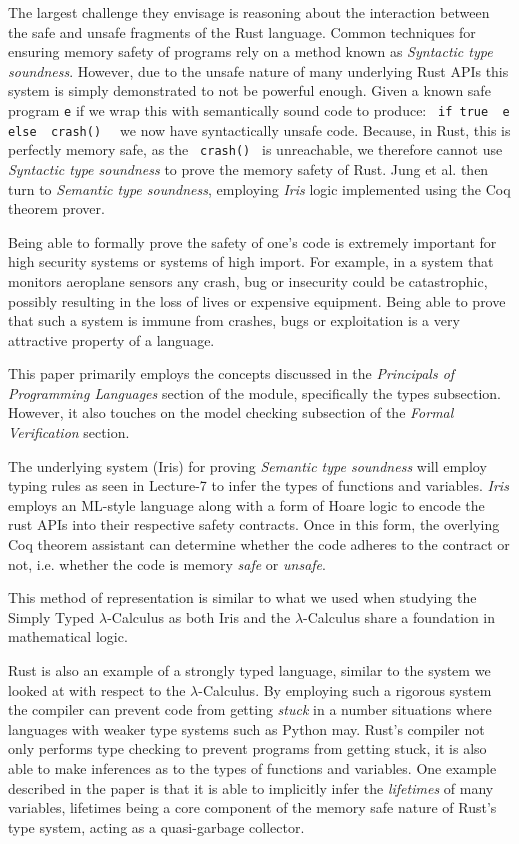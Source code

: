 \documentclass[11pt]{article}
\begin{document}
The largest challenge they envisage is reasoning about the interaction between the safe and unsafe fragments of the Rust language. Common techniques for ensuring memory safety of programs rely on a method known as \textit{Syntactic type soundness}. However, due to the unsafe nature of many underlying Rust APIs this system is simply demonstrated to not be powerful enough. Given a known safe program \texttt{e} if we wrap this with semantically sound code to produce: \texttt{ if true { e } else { crash() } } we now have syntactically unsafe code. Because, in Rust, this is perfectly memory safe, as the \texttt{ crash() } is unreachable, we therefore cannot use \textit{Syntactic type soundness} to prove the memory safety of Rust. Jung et al. then turn to \textit{Semantic type soundness}, employing \textit{Iris} logic implemented using the Coq theorem prover.

Being able to formally prove the safety of one's code is extremely important for high security systems or systems of high import. For example, in a system that monitors aeroplane sensors any crash, bug or insecurity could be catastrophic, possibly resulting in the loss of lives or expensive equipment. Being able to prove that such a system is immune from crashes, bugs or exploitation is a very attractive property of a language.

This paper primarily employs the concepts discussed in the \textit{Principals of Programming Languages} section of the module, specifically the types subsection. However, it also touches on the model checking subsection of the \textit{Formal Verification} section.

The underlying system (Iris) for proving \textit{Semantic type soundness} will employ typing rules as seen in Lecture-7 to infer the types of functions and variables. \textit{Iris} employs an ML-style language along with a form of Hoare logic to encode the rust APIs into their respective safety contracts. Once in this form, the overlying Coq theorem assistant can determine whether the code adheres to the contract or not, i.e. whether the code is memory \textit{safe} or \textit{unsafe}. 

This method of representation is similar to what we used when studying the Simply Typed $\lambda$-Calculus as both Iris and the $\lambda$-Calculus share a foundation in mathematical logic. 

Rust is also an example of a strongly typed language, similar to the system we looked at with respect to the $\lambda$-Calculus. By employing such a rigorous system the compiler can prevent code from getting \textit{stuck} in a number situations where languages with weaker type systems such as Python may. Rust's compiler not only performs type checking to prevent programs from getting stuck, it is also able to make inferences as to the types of functions and variables. One example described in the paper is that it is able to implicitly infer the \textit{lifetimes} of many variables, lifetimes being a core component of the memory safe nature of Rust's type system, acting as a quasi-garbage collector.
\end{document}
